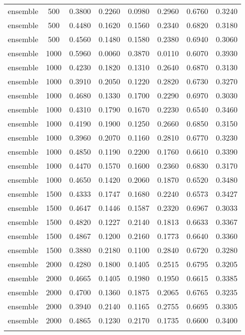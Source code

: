 \begin{scriptsize}
\begin{longtable}{cccccccc}
		ensemble & 500  & 0.3800 & 0.2260 & 0.0980 & 0.2960 & 0.6760 & 0.3240 \\
		ensemble & 500  & 0.4480 & 0.1620 & 0.1560 & 0.2340 & 0.6820 & 0.3180 \\
		ensemble & 500  & 0.4560 & 0.1480 & 0.1580 & 0.2380 & 0.6940 & 0.3060 \\
		ensemble & 1000 & 0.5960 & 0.0060 & 0.3870 & 0.0110 & 0.6070 & 0.3930 \\
		ensemble & 1000 & 0.4230 & 0.1820 & 0.1310 & 0.2640 & 0.6870 & 0.3130 \\
		ensemble & 1000 & 0.3910 & 0.2050 & 0.1220 & 0.2820 & 0.6730 & 0.3270 \\
		ensemble & 1000 & 0.4680 & 0.1330 & 0.1700 & 0.2290 & 0.6970 & 0.3030 \\
		ensemble & 1000 & 0.4310 & 0.1790 & 0.1670 & 0.2230 & 0.6540 & 0.3460 \\
		ensemble & 1000 & 0.4190 & 0.1900 & 0.1250 & 0.2660 & 0.6850 & 0.3150 \\
		ensemble & 1000 & 0.3960 & 0.2070 & 0.1160 & 0.2810 & 0.6770 & 0.3230 \\
		ensemble & 1000 & 0.4850 & 0.1190 & 0.2200 & 0.1760 & 0.6610 & 0.3390 \\
		ensemble & 1000 & 0.4470 & 0.1570 & 0.1600 & 0.2360 & 0.6830 & 0.3170 \\
		ensemble & 1000 & 0.4650 & 0.1420 & 0.2060 & 0.1870 & 0.6520 & 0.3480 \\
		ensemble & 1500 & 0.4333 & 0.1747 & 0.1680 & 0.2240 & 0.6573 & 0.3427 \\
		ensemble & 1500 & 0.4647 & 0.1446 & 0.1587 & 0.2320 & 0.6967 & 0.3033 \\
		ensemble & 1500 & 0.4820 & 0.1227 & 0.2140 & 0.1813 & 0.6633 & 0.3367 \\
		ensemble & 1500 & 0.4867 & 0.1200 & 0.2160 & 0.1773 & 0.6640 & 0.3360 \\
		ensemble & 1500 & 0.3880 & 0.2180 & 0.1100 & 0.2840 & 0.6720 & 0.3280 \\
		ensemble & 2000 & 0.4280 & 0.1800 & 0.1405 & 0.2515 & 0.6795 & 0.3205 \\
		ensemble & 2000 & 0.4665 & 0.1405 & 0.1980 & 0.1950 & 0.6615 & 0.3385 \\
		ensemble & 2000 & 0.4700 & 0.1360 & 0.1875 & 0.2065 & 0.6765 & 0.3235 \\
		ensemble & 2000 & 0.3940 & 0.2140 & 0.1165 & 0.2755 & 0.6695 & 0.3305 \\
		ensemble & 2000 & 0.4865 & 0.1230 & 0.2170 & 0.1735 & 0.6600 & 0.3400 \\
		\bottomrule
		\label{tab:anexo-confusion}
	\end{longtable}
\end{scriptsize}

